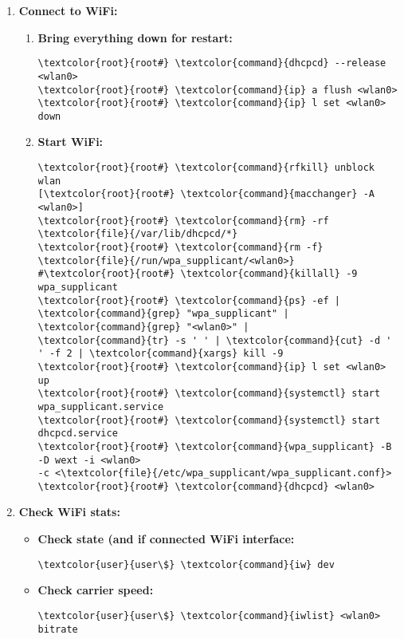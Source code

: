 \documentclass[10pt, a4paper, onecolumn, openany]{book} %
\begin{document}
\begin{enumerate}
\begin{Verbatim}[commandchars=\\\{\}]
\textcolor{comment}{## Unprotected:}
network=\{
    ssid="<ESSID>"
    scan_ssid=1 \textcolor{comment}{# Find hidden network}
    key_mgmt=NONE
    priority=3 \textcolor{comment}{# To which WiFi connect first}
\}
\end{Verbatim}
    \item \textbf{Connect to WiFi:}
    \begin{enumerate}
        \item \textbf{Bring everything down for restart:}
\begin{Verbatim}[commandchars=\\\{\}]
\textcolor{root}{root#} \textcolor{command}{dhcpcd} --release <wlan0>
\textcolor{root}{root#} \textcolor{command}{ip} a flush <wlan0>
\textcolor{root}{root#} \textcolor{command}{ip} l set <wlan0> down
\end{Verbatim}        
    \item \textbf{Start WiFi:}
\begin{Verbatim}[commandchars=\\\{\}]
\textcolor{root}{root#} \textcolor{command}{rfkill} unblock wlan
[\textcolor{root}{root#} \textcolor{command}{macchanger} -A <wlan0>]
\textcolor{root}{root#} \textcolor{command}{rm} -rf \textcolor{file}{/var/lib/dhcpcd/*}
\textcolor{root}{root#} \textcolor{command}{rm -f} \textcolor{file}{/run/wpa_supplicant/<wlan0>}
#\textcolor{root}{root#} \textcolor{command}{killall} -9 wpa_supplicant
\textcolor{root}{root#} \textcolor{command}{ps} -ef | \textcolor{command}{grep} "wpa_supplicant" | \textcolor{command}{grep} "<wlan0>" |
\textcolor{command}{tr} -s ' ' | \textcolor{command}{cut} -d ' ' -f 2 | \textcolor{command}{xargs} kill -9
\textcolor{root}{root#} \textcolor{command}{ip} l set <wlan0> up
\textcolor{root}{root#} \textcolor{command}{systemctl} start wpa_supplicant.service
\textcolor{root}{root#} \textcolor{command}{systemctl} start dhcpcd.service
\textcolor{root}{root#} \textcolor{command}{wpa_supplicant} -B -D wext -i <wlan0> 
-c <\textcolor{file}{/etc/wpa_supplicant/wpa_supplicant.conf}>
\textcolor{root}{root#} \textcolor{command}{dhcpcd} <wlan0>
\end{Verbatim}
    \end{enumerate}

    \item \textbf{Check WiFi stats:}
    \begin{itemize}
        \item \textbf{Check state (and if connected WiFi interface:}
\begin{Verbatim}[commandchars=\\\{\}]
\textcolor{user}{user\$} \textcolor{command}{iw} dev
\end{Verbatim}
        \item \textbf{Check carrier speed:}
\begin{Verbatim}[commandchars=\\\{\}]
\textcolor{user}{user\$} \textcolor{command}{iwlist} <wlan0> bitrate
\end{Verbatim}
    \end{itemize}
\end{enumerate}
\end{document}
